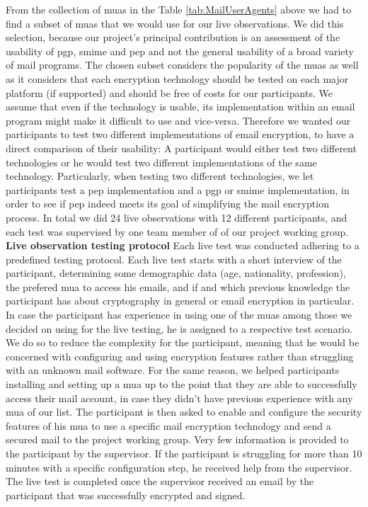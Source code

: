 From the collection of \acrshort{mua}s in the Table \ref{tab:MailUserAgents} above we had to find a subset of \acrshort{mua}s that we would use for our live observations. We did this selection, because our project’s principal contribution is an assessment of the usability of \acrshort{pgp}, \acrshort{smime} and \acrshort{pep} and not the general usability of a broad variety of mail programs. The chosen subset considers the popularity of the \acrshort{mua}s as well as it considers that each encryption technology should be tested on each major platform (if supported) and should be free of costs for our participants. We assume that even if the technology is usable, its implementation within an \acrshort{email} program might make it difficult to use and vice-versa. Therefore we wanted our participants to test two
different implementations of \acrshort{email} encryption, to have a direct comparison of their usability:
\newline
A participant would either test two different technologies or he would test two different implementations of the same technology. Particularly, when testing two different technologies, we let participants test a \acrshort{pep} implementation and a \acrshort{pgp} or \acrshort{smime} implementation, in order to see if \acrshort{pep} indeed meets its goal of simplifying the mail encryption process.
In total we did 24 live observations with 12 different participants, and each test was supervised by one team member of of our project working group.
\newline
\newline
\textbf{Live observation testing protocol}
\newline
Each live test was conducted adhering to a predefined testing protocol. Each live test starts with a short interview of the participant, determining some demographic data (age, nationality, profession), the prefered \acrshort{mua} to access his \acrshort{email}s, and if and which previous knowledge the participant has about cryptography in general or email encryption in particular. In case the participant has experience in using one of the \acrshort{mua}s among those we decided on using for the live testing, he is assigned to a respective test scenario. We do so to reduce the complexity for the participant, meaning that he would be concerned with configuring and using encryption features rather than struggling with an unknown mail software. For the same reason, we helped participants installing and setting up a \acrshort{mua} up to the point that they are able to successfully access their mail account, in case they didn’t have previous experience with any \acrshort{mua} of our list. The participant is then asked to enable and configure the security features of his \acrshort{mua} to use a specific mail encryption technology and send a secured mail to the project working group. Very few information is provided to the participant by the supervisor. If the participant is struggling for more than 10 minutes with a specific configuration step, he received help from the supervisor. The live test is completed once the supervisor received an \acrshort{email} by the participant that was successfully encrypted and signed.